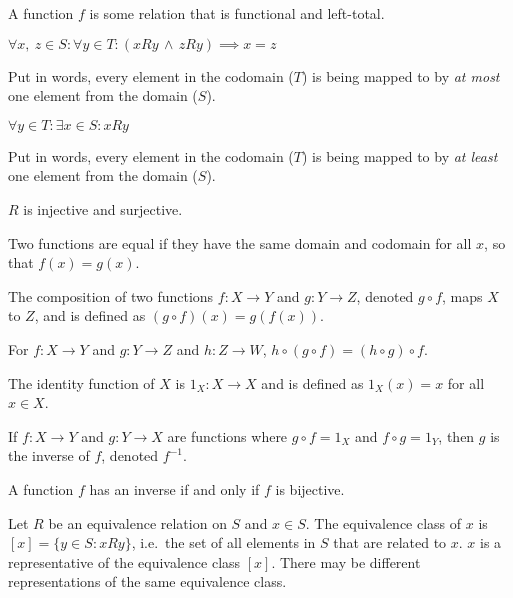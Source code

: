 \documentclass{article}
\begin{document}
\begin{definition}
    A function \(f\) is some relation that is functional and left-total.
\end{definition}
%
\begin{tcolorboxlarge}[title={Function Properties}]
    \begin{description}[style=sameline]
        \item[Injective (one-to-one)]
            \(\forall x,\: z \in S : \forall y \in T
            : (xRy \,\land\, zRy) \implies x = z\)

            Put in words, every element in the codomain (\(T\))
            is being mapped to by \textit{at most} one element from the domain (\(S\)).
        \item[Surjective (onto)]
            \(\forall y \in T : \exists x \in S : xRy\)

            Put in words, every element in the codomain (\(T\))
            is being mapped to by \textit{at least} one element from the domain (\(S\)).
        \item[Bijective]
            \(R\) is injective and surjective.
    \end{description}
\end{tcolorboxlarge}
%
\begin{definition}
    Two functions are equal if they have the same domain and codomain
    for all \(x\), so that \(f(x) = g(x)\).
\end{definition}
%
\begin{definition}
    The composition of two functions \(f:X \to Y\) and \(g:Y \to Z\),
    denoted \(g \circ f\), maps \(X\) to \(Z\), and is defined as
    \((g \circ f)(x) = g(f(x))\).
\end{definition}
%
\begin{theorem}
    For \(f:X \to Y\) and \(g:Y \to Z\) and  \(h:Z \to W\),
    \(h \circ (g \circ f) = (h \circ g) \circ f\).
\end{theorem}
%
\begin{definition}
    The identity function of \(X\) is \(1_X:X \to X\) and is defined as
    \(1_X (x)=x\) for all \(x \in X\).
\end{definition}
%
\begin{definition}
    If \(f:X \to Y\) and \(g:Y \to X\) are functions where
    \(g \circ f = 1_X\) and \(f \circ g = 1_Y\),
    then \(g\) is the inverse of \(f\), denoted \(f^{-1}\).
\end{definition}
%
\begin{theorem}
    A function \(f\) has an inverse if and only if \(f\) is bijective.
\end{theorem}
%
\begin{definition}
    Let \(R\) be an equivalence relation on \(S\) and \(x \in S\).
    The equivalence class of \(x\) is \([x] = \{y \in S : xRy\}\),
    i.e.\ the set of all elements in \(S\) that are related to \(x\).
    \(x\) is a representative of the equivalence class \([x]\).
    There may be different representations of the same equivalence class.
\end{definition}
%
\end{document}
